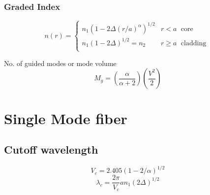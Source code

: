 \documentclass[12pt, onecolumn]{article}
\begin{document}
        \subsubsection{Graded Index}
            \begin{equation}
                n(r) = 
                \begin{cases}
                    n_1(1-2\Delta(r/a)^\alpha)^{1/2} & r < a \; \text{ core } \\
                    n_1(1-2\Delta)^{1/2} = n_2 & r \ge a \; \text{ cladding } \\                    
                \end{cases}
                \label{eq:graded_index}
            \end{equation}
            
            No. of guided modes or mode volume
            \begin{equation}
                M_g = \left(\frac{\alpha}{\alpha + 2}\right)\left(\frac{V^2}{2}\right)
                \label{eq:mode_vol_g}
            \end{equation}

\section{Single Mode fiber}
    \subsection{Cutoff wavelength}
        \begin{equation}
            V_c = 2.405(1-2/\alpha)^{1/2} 
            \label{eq:cutoff_norm_freq}
        \end{equation}
        \begin{equation}
            \lambda_c = \frac{2\pi}{V_c}a n_1 (2\Delta)^{1/2}
            \label{eq:cutoff_wavelength}
        \end{equation}
\end{document}
